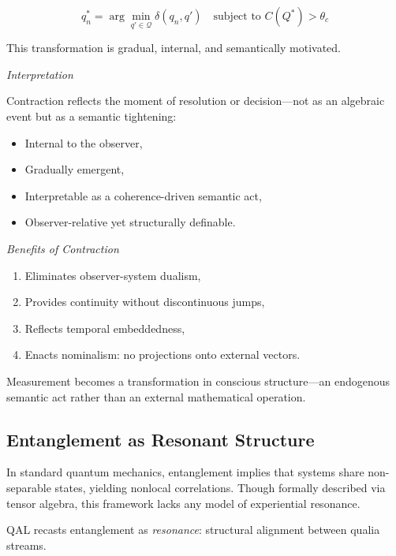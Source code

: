 \documentclass[11pt]{article}
\numberwithin{equation}{section} %
\begin{document}
\begin{equation}
q_n^* = \arg\min_{q' \in \mathcal{Q}} \delta(q_n, q') \quad \text{subject to } C(Q^*) > \theta_c
\end{equation}

This transformation is gradual, internal, and semantically motivated.

\bigskip

\textit{Interpretation}

Contraction reflects the moment of resolution or decision---not as an algebraic event but as a semantic tightening:
\begin{itemize}
  \item Internal to the observer,
  \item Gradually emergent,
  \item Interpretable as a coherence-driven semantic act,
  \item Observer-relative yet structurally definable.
\end{itemize}

\bigskip

\textit{Benefits of Contraction}

\begin{enumerate}
  \item Eliminates observer-system dualism,
  \item Provides continuity without discontinuous jumps,
  \item Reflects temporal embeddedness,
  \item Enacts nominalism: no projections onto external vectors.
\end{enumerate}

Measurement becomes a transformation in conscious structure---an endogenous semantic act rather than an external mathematical operation.

\subsection{Entanglement as Resonant Structure}

In standard quantum mechanics, entanglement implies that systems share non-separable states, yielding nonlocal correlations. Though formally described via tensor algebra, this framework lacks any model of experiential resonance.

QAL recasts entanglement as \textit{resonance}: structural alignment between qualia streams.

\bigskip
\end{document}
